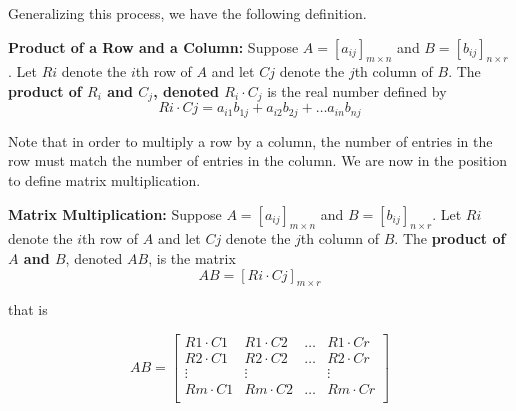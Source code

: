 \documentclass{ximera}
\begin{document}
Generalizing this process, we have the following definition.

\smallskip


\begin{definition} \label{rowcolumnproduct} \textbf{Product of a Row and a Column:}  Suppose $A = [a_{ij}]_{m \times n}$ and $B = [b_{ij}]_{n \times r}$.  Let $Ri$ denote the $i$th row of $A$ and let $Cj$ denote the $j$th column of $B$.  The  \textbf{product of \boldmath $R_{i}$ and \boldmath $C_{j}$, denoted $R_{i} \cdot C_{j}$} is the real number defined by
\[ Ri \cdot Cj = a_{i1}b_{1j} + a_{i2}b_{2j} + \ldots a_{in}b_{nj}\]

\end{definition}


\smallskip

Note that in order to multiply a row by a column, the number of entries in the row must match the number of entries in the column.  We are now in the position to define matrix multiplication.  

\smallskip


\begin{definition} \label{matrixproduct} \textbf{Matrix Multiplication:}  Suppose $A = [a_{ij}]_{m \times n}$ and $B = [b_{ij}]_{n \times r}$.  Let $Ri$ denote the $i$th row of $A$ and let $Cj$ denote the $j$th column of $B$.  The  \textbf{product of \boldmath $A$ and \boldmath $B$}, denoted $AB$, is the matrix
\[AB = \left[ Ri \cdot Cj \right]_{m \times r} \]

that is

\[AB = \left[
\begin{array}{cccc} 
R1 \cdot C1 & R1 \cdot C2 & \ldots & R1 \cdot Cr \\  
R2 \cdot C1 & R2 \cdot C2 & \ldots & R2 \cdot Cr \\
   \vdots  & \vdots & & \vdots \\
Rm \cdot C1 & Rm \cdot C2 & \ldots & Rm \cdot Cr \\  \end{array} \right] \]

\end{definition}


\smallskip
\end{document}

